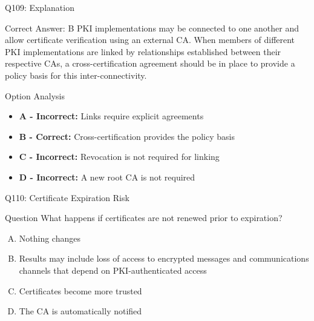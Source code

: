 \documentclass{beamer}
\begin{document}
	\begin{frame}{Q109: Explanation}
		\begin{block}{Correct Answer: B}
			PKI implementations may be connected to one another and allow certificate verification using an external CA. When members of different PKI implementations are linked by relationships established between their respective CAs, a cross-certification agreement should be in place to provide a policy basis for this inter-connectivity.
		\end{block}
		\begin{block}{Option Analysis}
			\begin{itemize}
				\item \textbf{A - Incorrect:} Links require explicit agreements
				\item \textbf{B - Correct:} Cross-certification provides the policy basis
				\item \textbf{C - Incorrect:} Revocation is not required for linking
				\item \textbf{D - Incorrect:} A new root CA is not required
			\end{itemize}
		\end{block}
	\end{frame}
	
	\begin{frame}{Q110: Certificate Expiration Risk}
		\begin{block}{Question}
			What happens if certificates are not renewed prior to expiration?
		\end{block}
		\begin{enumerate}[(A)]
			\item Nothing changes
			\item Results may include loss of access to encrypted messages and communications channels that depend on PKI-authenticated access
			\item Certificates become more trusted
			\item The CA is automatically notified
		\end{enumerate}
	\end{frame}
	
\end{document}
